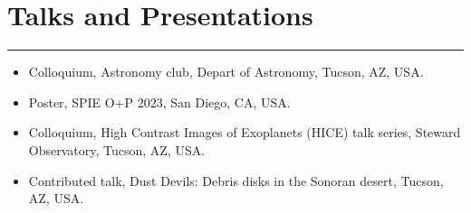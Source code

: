 \documentclass[11pt]{article}
\newcommand{\resumesection}[1]{\vspace{-0.2cm}\section*{#1}\vspace{-0.2cm}\hrule\vspace{0.2cm}}
\begin{document}
\resumesection{Talks and Presentations}
\begin{itemize}
	\item Colloquium, Astronomy club, Depart of Astronomy, Tucson, AZ, USA.  
    \item Poster, SPIE O+P 2023, San Diego, CA, USA.
    \item Colloquium, High Contrast Images of Exoplanets (HICE) talk series, Steward Observatory, Tucson, AZ, USA.
    \item Contributed talk, Dust Devils: Debris disks in the Sonoran desert, Tucson, AZ, USA.
\end{itemize}
\end{document}
